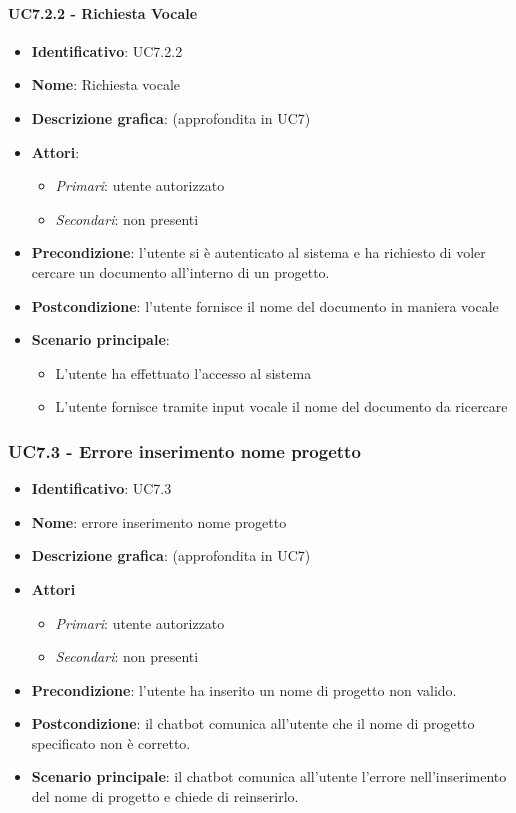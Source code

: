 \paragraph{UC7.2.2 - Richiesta Vocale}
\begin{itemize}
   \item \textbf{Identificativo}: UC7.2.2
   \item \textbf{Nome}: Richiesta vocale
   \item \textbf{Descrizione grafica}: (approfondita in UC7)
   \item \textbf{Attori}:
   \begin{itemize} 
       \item \textit{Primari}: utente autorizzato
       \item \textit{Secondari}: non presenti
   \end{itemize}
       \item \textbf{Precondizione}: l'utente si è autenticato al sistema e ha richiesto di voler cercare un documento all'interno di un progetto.
       \item \textbf{Postcondizione}: l'utente fornisce il nome del documento in maniera vocale
    \item \textbf{Scenario principale}: 
       \begin{itemize}
           \item L'utente ha effettuato l'accesso al sistema 
           \item L'utente fornisce tramite input vocale il nome del documento da ricercare
       \end{itemize}
\end{itemize}

\subsubsection{UC7.3 - Errore inserimento nome progetto}
\begin{itemize}
    \item \textbf{Identificativo}: UC7.3
    \item \textbf{Nome}: errore inserimento nome progetto
    \item \textbf{Descrizione grafica}: (approfondita in UC7)
    \item \textbf{Attori}
 \begin{itemize} 
    \item \textit{Primari}: utente autorizzato
    \item \textit{Secondari}: non presenti
 \end{itemize}
 \item \textbf{Precondizione}: l'utente ha inserito un nome di progetto non valido.
 \item \textbf{Postcondizione}:  il chatbot comunica all'utente che il nome di progetto specificato non è corretto.
 \item \textbf{Scenario principale}: il chatbot comunica all'utente l'errore nell'inserimento del nome di progetto e chiede di reinserirlo.
\end{itemize}
